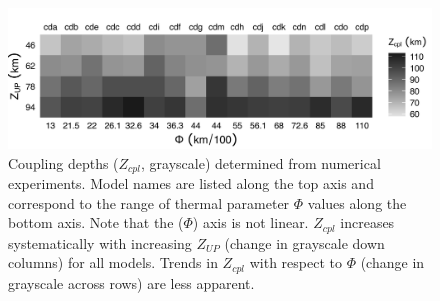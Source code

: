 \begin{figure}[htbp]

{\centering \includegraphics[width=1\linewidth,]{assets/figs/chpt2/figA5} 

}

\caption[Coupling depths determined from numerical experiments]{Coupling depths ($Z_{cpl}$, grayscale) determined from numerical experiments. Model names are listed along the top axis and correspond to the range of thermal parameter $\Phi$ values along the bottom axis. Note that the ($\Phi$) axis is not linear. $Z_{cpl}$ increases systematically with increasing $Z_{UP}$ (change in grayscale down columns) for all models. Trends in $Z_{cpl}$ with respect to $\Phi$ (change in grayscale across rows) are less apparent.}\label{fig:results}
\end{figure}

\begingroup
\renewcommand{\arraystretch}{0.5}

